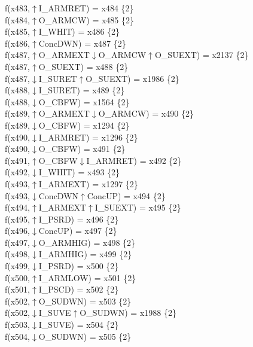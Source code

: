 f(x483,$\uparrow$I\_ARMRET) = x484 \{2\} \\  
f(x484,$\uparrow$O\_ARMCW) = x485 \{2\} \\  
f(x485,$\uparrow$I\_WHIT) = x486 \{2\} \\  
f(x486,$\uparrow$ConcDWN) = x487 \{2\} \\  
f(x487,$\uparrow$O\_ARMEXT$\downarrow$O\_ARMCW$\uparrow$O\_SUEXT) = x2137 \{2\} \\  
f(x487,$\uparrow$O\_SUEXT) = x488 \{2\} \\  
f(x487,$\downarrow$I\_SURET$\uparrow$O\_SUEXT) = x1986 \{2\} \\  
f(x488,$\downarrow$I\_SURET) = x489 \{2\} \\  
f(x488,$\downarrow$O\_CBFW) = x1564 \{2\} \\  
f(x489,$\uparrow$O\_ARMEXT$\downarrow$O\_ARMCW) = x490 \{2\} \\  
f(x489,$\downarrow$O\_CBFW) = x1294 \{2\} \\  
f(x490,$\downarrow$I\_ARMRET) = x1296 \{2\} \\  
f(x490,$\downarrow$O\_CBFW) = x491 \{2\} \\  
f(x491,$\uparrow$O\_CBFW$\downarrow$I\_ARMRET) = x492 \{2\} \\  
f(x492,$\downarrow$I\_WHIT) = x493 \{2\} \\  
f(x493,$\uparrow$I\_ARMEXT) = x1297 \{2\} \\  
f(x493,$\downarrow$ConcDWN$\uparrow$ConcUP) = x494 \{2\} \\  
f(x494,$\uparrow$I\_ARMEXT$\uparrow$I\_SUEXT) = x495 \{2\} \\  
f(x495,$\uparrow$I\_PSRD) = x496 \{2\} \\  
f(x496,$\downarrow$ConcUP) = x497 \{2\} \\  
f(x497,$\downarrow$O\_ARMHIG) = x498 \{2\} \\  
f(x498,$\downarrow$I\_ARMHIG) = x499 \{2\} \\  
f(x499,$\downarrow$I\_PSRD) = x500 \{2\} \\  
f(x500,$\uparrow$I\_ARMLOW) = x501 \{2\} \\  
f(x501,$\uparrow$I\_PSCD) = x502 \{2\} \\  
f(x502,$\uparrow$O\_SUDWN) = x503 \{2\} \\  
f(x502,$\downarrow$I\_SUVE$\uparrow$O\_SUDWN) = x1988 \{2\} \\  
f(x503,$\downarrow$I\_SUVE) = x504 \{2\} \\  
f(x504,$\downarrow$O\_SUDWN) = x505 \{2\} \\  
